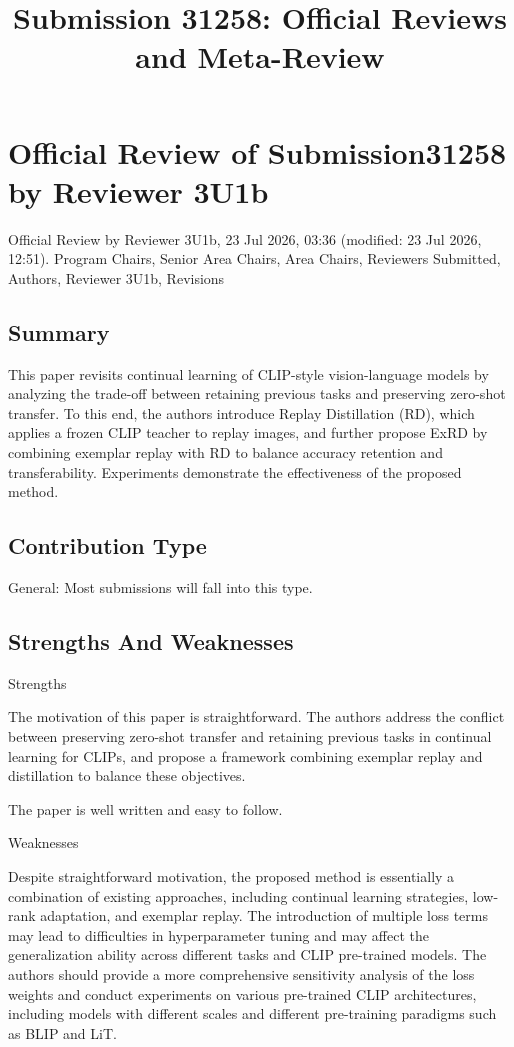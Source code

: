 \documentclass[11pt]{article}
\title{Submission 31258: Official Reviews and Meta-Review}
\author{}
\date{}
\begin{document}
\maketitle

\section*{Official Review of Submission31258 by Reviewer 3U1b}

Official Review by Reviewer 3U1b, 23 Jul 2026, 03:36 (modified: 23 Jul 2026, 12:51). Program Chairs, Senior Area Chairs, Area Chairs, Reviewers Submitted, Authors, Reviewer 3U1b, Revisions

\subsection*{Summary}
This paper revisits continual learning of CLIP-style vision-language models by analyzing the trade-off between retaining previous tasks and preserving zero-shot transfer. To this end, the authors introduce Replay Distillation (RD), which applies a frozen CLIP teacher to replay images, and further propose ExRD by combining exemplar replay with RD to balance accuracy retention and transferability. Experiments demonstrate the effectiveness of the proposed method.

\subsection*{Contribution Type}
General: Most submissions will fall into this type.

\subsection*{Strengths And Weaknesses}
Strengths

The motivation of this paper is straightforward. The authors address the conflict between preserving zero-shot transfer and retaining previous tasks in continual learning for CLIPs, and propose a framework combining exemplar replay and distillation to balance these objectives.

The paper is well written and easy to follow.

Weaknesses

Despite straightforward motivation, the proposed method is essentially a combination of existing approaches, including continual learning strategies, low-rank adaptation, and exemplar replay. The introduction of multiple loss terms may lead to difficulties in hyperparameter tuning and may affect the generalization ability across different tasks and CLIP pre-trained models. The authors should provide a more comprehensive sensitivity analysis of the loss weights and conduct experiments on various pre-trained CLIP architectures, including models with different scales and different pre-training paradigms such as BLIP and LiT.
\end{document}
